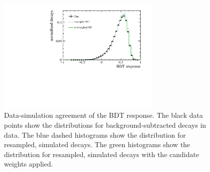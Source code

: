 \begin{figure}[!tb]
 \centering
 \includegraphics[width=0.7\textwidth]{figs/kpimm/data-mc/reweighting/BDT.pdf}
 
 \caption{Data-simulation agreement of the BDT response. The black data points show the distributions for background-subtracted \BdToJPsiKst decays in data. The blue dashed histograms show the distribution for resampled, simulated \BdToJPsiKst decays. The green histograms show the distribution for resampled, simulated \BdToJPsiKst decays with the candidate weights applied.}
\label{fig:data-mc:bdt}
\end{figure}